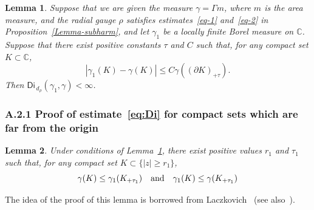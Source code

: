\documentclass[11pt]{amsart}
\numberwithin{equation}{section}
\newtheorem{lemma}{Lemma}[section]
\newcommand{\bC}{\mathbb C}
\begin{document}
\begin{lemma}\label{LemmaF}
Suppose that we are given the measure $\gamma = \Gamma m$, where $m$ is the area measure, and the radial gauge $\rho$ satisfies estimates~\eqref{eq-1}
and~\eqref{eq-2} in Proposition~\ref{Lemma-subharm}, and let $\gamma_1$ be a locally finite Borel measure on $\bC$.
Suppose that there exist positive constants $\tau$ and $C$ such that, for any compact
set $K\subset\bC$, 
\begin{equation}
|\gamma_1 (K)-\gamma(K)|\le C \gamma((\partial K)_{+\tau}). 
\label{dop5}
\end{equation}
Then
$\mathsf{Di}_{\, d_\rho}(\gamma_1, \gamma)<\infty$.
\end{lemma}

\subsubsection*{A.2.1 Proof of estimate~\eqref{eq:Di} for compact sets which are far from the origin}

\begin{lemma}\label{LemmaE} Under conditions of Lemma~\ref{LemmaF},
there exist positive values $r_1$ and $\tau_1$ such that, for any compact set
$K\subset\{|z|\ge r_1\}$,
\[
\gamma(K) \le \gamma_1(K_{+\tau_1}) \quad {\rm and} \quad
\gamma_1(K) \le \gamma(K_{+\tau_1})
\]
\end{lemma}

The idea of the proof of this lemma is borrowed from Laczkovich~\cite{Laczk} (see also~\cite[Lemma~2.1]{ST-Transp}).
\end{document}
